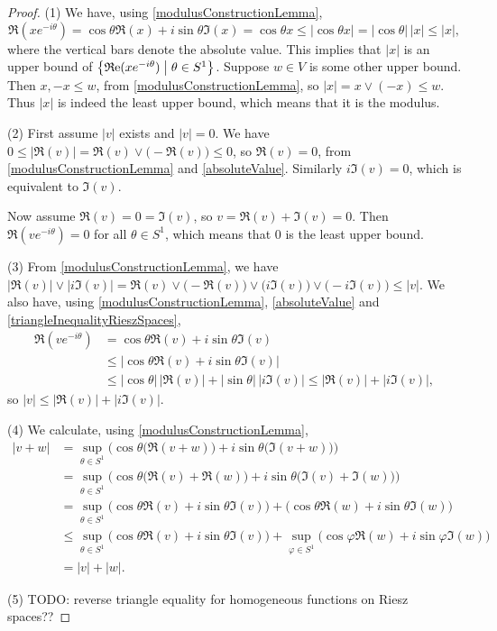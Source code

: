 \begin{proof}
(1) We have, using \ref{modulusConstructionLemma},
\[ \Re(xe^{-i\theta}) = \cos\theta\Re(x) + i\sin\theta\Im(x) = \cos\theta x \leq |\cos\theta x| = |\cos\theta|\,|x| \leq |x|,  \]
where the vertical bars denote the absolute value. This implies that $|x|$ is an upper bound of $\setbuilder{\Re(xe^{-i\theta})}{\theta\in S^1}$. Suppose $w \in V$ is some other upper bound. Then $x,-x \leq w$, from \ref{modulusConstructionLemma}, so $|x| = x\vee(-x) \leq w$. Thus $|x|$ is indeed the least upper bound, which means that it is the modulus.

(2) First assume $|v|$ exists and $|v| = 0$. We have $0\leq \big|\Re(v)\big| = \Re(v)\vee\big(-\Re(v)\big) \leq 0$, so $\Re(v) = 0$, from \ref{modulusConstructionLemma} and \ref{absoluteValue}. Similarly $i\Im(v) = 0$, which is equivalent to $\Im(v)$.

Now assume $\Re(v) = 0 = \Im(v)$, so $v = \Re(v) + \Im(v) = 0$. Then $\Re(ve^{-i\theta}) = 0$ for all $\theta\in S^1$, which means that $0$ is the least upper bound.

(3) From \ref{modulusConstructionLemma}, we have $|\Re(v)|\vee |i\Im(v)| = \Re(v)\vee\big(-\Re(v)\big) \vee \big(i\Im(v)\big) \vee\big(-i\Im(v)\big) \leq |v|$. We also have, using \ref{modulusConstructionLemma}, \ref{absoluteValue} and \ref{triangleInequalityRieszSpaces},
\begin{align*}
\Re(ve^{-i\theta}) &= \cos\theta\Re(v) + i\sin\theta\Im(v) \\
&\leq \big|\cos\theta\Re(v) + i\sin\theta\Im(v)\big| \\
&\leq |\cos\theta|\,|\Re(v)| + |\sin\theta|\,|i\Im(v)| \leq |\Re(v)| + |i\Im(v)|,
\end{align*}
so $|v| \leq |\Re(v)| + |i\Im(v)|$.

(4) We calculate, using \ref{modulusConstructionLemma},
\begin{align*}
\big|v + w\big| &= \sup_{\theta\in S^1}\Big(\cos\theta\big(\Re(v+w)\big) + i\sin\theta\big(\Im(v+w)\big)\Big) \\
&= \sup_{\theta\in S^1}\Big(\cos\theta\big(\Re(v)+\Re(w)\big) + i\sin\theta\big(\Im(v)+\Im(w)\big)\Big) \\
&= \sup_{\theta\in S^1}\big(\cos\theta\Re(v) + i\sin\theta\Im(v)\big) + \big(\cos\theta\Re(w) + i\sin\theta\Im(w)\big) \\
&\leq \sup_{\theta\in S^1}\big(\cos\theta\Re(v) + i\sin\theta\Im(v)\big) + \sup_{\varphi\in S^1}\big(\cos\varphi\Re(w) + i\sin\varphi\Im(w)\big) \\
&= |v| + |w|.
\end{align*}

(5) TODO: reverse triangle equality for homogeneous functions on Riesz spaces??
\end{proof}

